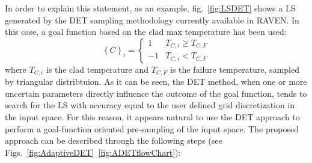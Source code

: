 In order to explain this statement, as an example, fig.~\ref{fig:LSDET} shows a LS generated by the DET sampling methodology currently available in RAVEN. In this case, a goal function based on the clad max temperature has been used:
\begin{equation}
\left \{ C \right \}_{i}=\left \{ \begin{matrix}
1 & T_{C,i}\geq T_{C,F}\\
-1 & T_{C,i}<  T_{C,F}
\end{matrix} \right.
\end{equation}
where $T_{C,i}$ is the clad temperature and $T_{C,F}$ is the failure temperature, sampled by triangular distribtuion.
As it can be seen, the DET method, when one or more uncertain parameters directly influence the outcome of the goal function, tends to search for the LS with accuracy equal to the user defined grid discretization in the input space.
For this reason, it appears natural to use the DET approach to perform a goal-function oriented pre-sampling of the input space. The proposed approach can be described through the following steps (see Figs.~\ref{fig:AdaptiveDET}~\ref{fig:ADETflowChart}):
